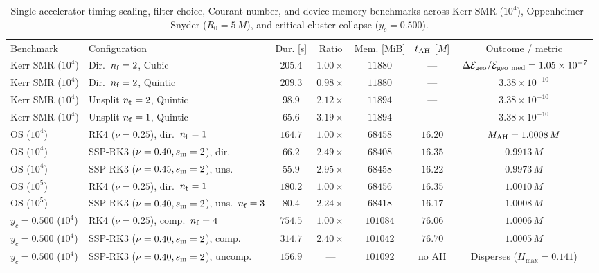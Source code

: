 \begin{table}[tbp]
\caption{\label{tab:bench_speed_memory}%
Single-accelerator timing scaling, filter choice, Courant number, and device memory benchmarks across Kerr SMR ($10^4$), Oppenheimer--Snyder ($R_0 = 5\,M$), and critical cluster collapse ($y_c = 0.500$).}
\scriptsize
\setlength{\tabcolsep}{3.0pt}
\begin{ruledtabular}
\begin{tabular}{llccccc}
Benchmark & Configuration & Dur. [s] & Ratio & Mem. [MiB] & $t_{\rm AH}$ [$M$] & Outcome / metric \\
\colrule
Kerr SMR ($10^4$) & Dir.\ $n_{\rm f}=2$, Cubic & $205.4$ & $1.00\times$ & $11880$ & --- & $|\Delta\mathcal{E}_{\rm geo}/\mathcal{E}_{\rm geo}|_{\rm med}=1.05\times 10^{-7}$ \\
Kerr SMR ($10^4$) & Dir.\ $n_{\rm f}=2$, Quintic & $209.3$ & $0.98\times$ & $11880$ & --- & $3.38\times 10^{-10}$ \\
Kerr SMR ($10^4$) & Unsplit $n_{\rm f}=2$, Quintic & $98.9$ & $2.12\times$ & $11894$ & --- & $3.38\times 10^{-10}$ \\
Kerr SMR ($10^4$) & Unsplit $n_{\rm f}=1$, Quintic & $65.6$ & $3.19\times$ & $11894$ & --- & $3.38\times 10^{-10}$ \\
\colrule
OS ($10^4$) & RK4 ($\nu=0.25$), dir.\ $n_{\rm f}=1$ & $164.7$ & $1.00\times$ & $68458$ & $16.20$ & $M_{\rm AH}=1.0008\,M$ \\
OS ($10^4$) & SSP-RK3 ($\nu=0.40, s_{\rm m}=2$), dir. & $66.2$ & $2.49\times$ & $68408$ & $16.35$ & $0.9913\,M$ \\
OS ($10^4$) & SSP-RK3 ($\nu=0.45, s_{\rm m}=2$), uns. & $55.9$ & $2.95\times$ & $68458$ & $16.22$ & $0.9973\,M$ \\
OS ($10^5$) & RK4 ($\nu=0.25$), dir.\ $n_{\rm f}=1$ & $180.2$ & $1.00\times$ & $68456$ & $16.35$ & $1.0010\,M$ \\
OS ($10^5$) & SSP-RK3 ($\nu=0.40, s_{\rm m}=2$), uns.\ $n_{\rm f}=3$ & $80.4$ & $2.24\times$ & $68418$ & $16.17$ & $1.0008\,M$ \\
\colrule
$y_c = 0.500$ ($10^4$) & RK4 ($\nu=0.25$), comp.\ $n_{\rm f}=4$ & $754.5$ & $1.00\times$ & $101084$ & $76.06$ & $1.0006\,M$ \\
$y_c = 0.500$ ($10^4$) & SSP-RK3 ($\nu=0.40, s_{\rm m}=2$), comp. & $314.7$ & $2.40\times$ & $101042$ & $76.70$ & $1.0005\,M$ \\
$y_c = 0.500$ ($10^4$) & SSP-RK3 ($\nu=0.40, s_{\rm m}=2$), uncomp. & $156.9$ & --- & $101092$ & no AH & Disperses ($H_{\max}=0.141$) \\
\end{tabular}
\end{ruledtabular}
\end{table}
